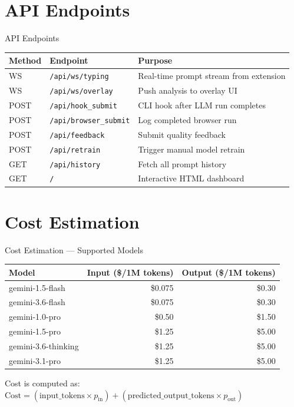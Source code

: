 \documentclass[aspectratio=169]{beamer}
\begin{document}
\section{API Endpoints}
\begin{frame}{API Endpoints}
  \begin{table}
    \centering
    \small
    \begin{tabular}{lll}
      \toprule
      \textbf{Method} & \textbf{Endpoint} & \textbf{Purpose} \\
      \midrule
      WS  & \texttt{/api/ws/typing}      & Real-time prompt stream from extension \\
      WS  & \texttt{/api/ws/overlay}     & Push analysis to overlay UI \\
      POST & \texttt{/api/hook\_submit}  & CLI hook after LLM run completes \\
      POST & \texttt{/api/browser\_submit} & Log completed browser run \\
      POST & \texttt{/api/feedback}      & Submit quality feedback \\
      POST & \texttt{/api/retrain}       & Trigger manual model retrain \\
      GET  & \texttt{/api/history}       & Fetch all prompt history \\
      GET  & \texttt{/}                  & Interactive HTML dashboard \\
      \bottomrule
    \end{tabular}
  \end{table}
\end{frame}

\section{Cost Estimation}
\begin{frame}{Cost Estimation — Supported Models}
  \begin{table}
    \centering
    \small
    \begin{tabular}{lrr}
      \toprule
      \textbf{Model} & \textbf{Input (\$/1M tokens)} & \textbf{Output (\$/1M tokens)} \\
      \midrule
      gemini-1.5-flash  & \$0.075  & \$0.30 \\
      gemini-3.6-flash  & \$0.075  & \$0.30 \\
      gemini-1.0-pro    & \$0.50   & \$1.50 \\
      gemini-1.5-pro    & \$1.25   & \$5.00 \\
      gemini-3.6-thinking & \$1.25 & \$5.00 \\
      gemini-3.1-pro    & \$1.25   & \$5.00 \\
      \bottomrule
    \end{tabular}
  \end{table}
  \vspace{0.3em}
  \small
  Cost is computed as: \quad
  $\text{Cost} = (\text{input\_tokens} \times p_{\text{in}}) + (\text{predicted\_output\_tokens} \times p_{\text{out}})$
\end{frame}
\end{document}
